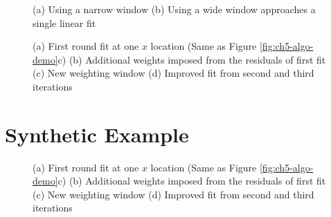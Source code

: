%




\begin{figure}
	\centering
	\caption[Effect of window size on LOWESS fit]{
		(a) Using a narrow window 
		(b) Using a wide window approaches a single linear fit
	}
	\label{fig:ch5-algo-window}
\end{figure}


\begin{figure}
	\centering
	\caption[Multiple iterations of LOWESS fit]{
		(a) First round fit at one $ x $ location (Same as Figure \ref{fig:ch5-algo-demo}c)
		(b) Additional weights imposed from the residuals of first fit
		(c) New weighting window
		(d) Improved fit from second and third iterations
	}
	\label{fig:ch5-algo-iteration}
\end{figure}


\section{Synthetic Example}



\begin{figure}
	\centering
	\caption[Multiple iterations of LOWESS fit]{
		(a) First round fit at one $ x $ location (Same as Figure \ref{fig:ch5-algo-demo}c)
		(b) Additional weights imposed from the residuals of first fit
		(c) New weighting window
		(d) Improved fit from second and third iterations
	}
	\label{fig:ch5-compare-tri}
\end{figure}



